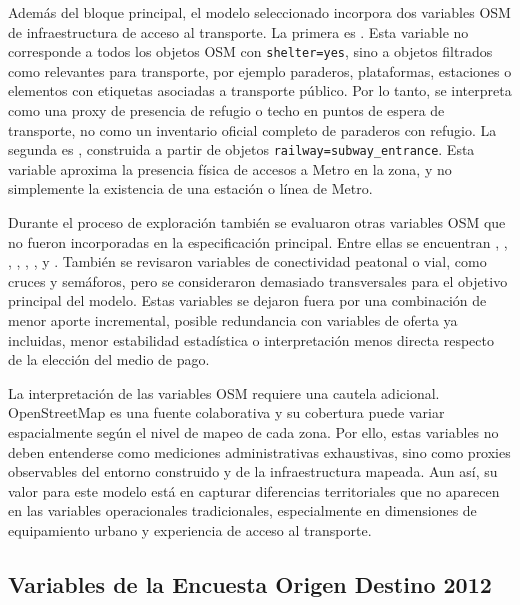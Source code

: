 Además del bloque principal, el modelo seleccionado incorpora dos variables OSM de infraestructura de acceso al transporte. La primera es . Esta variable no corresponde a todos los objetos OSM con \texttt{shelter=yes}, sino a objetos filtrados como relevantes para transporte, por ejemplo paraderos, plataformas, estaciones o elementos con etiquetas asociadas a transporte público. Por lo tanto, se interpreta como una proxy de presencia de refugio o techo en puntos de espera de transporte, no como un inventario oficial completo de paraderos con refugio. La segunda es , construida a partir de objetos \texttt{railway=subway\_entrance}. Esta variable aproxima la presencia física de accesos a Metro en la zona, y no simplemente la existencia de una estación o línea de Metro.

Durante el proceso de exploración también se evaluaron otras variables OSM que no fueron incorporadas en la especificación principal. Entre ellas se encuentran , , , , , ,  y . También se revisaron variables de conectividad peatonal o vial, como cruces y semáforos, pero se consideraron demasiado transversales para el objetivo principal del modelo. Estas variables se dejaron fuera por una combinación de menor aporte incremental, posible redundancia con variables de oferta ya incluidas, menor estabilidad estadística o interpretación menos directa respecto de la elección del medio de pago.

La interpretación de las variables OSM requiere una cautela adicional. OpenStreetMap es una fuente colaborativa y su cobertura puede variar espacialmente según el nivel de mapeo de cada zona. Por ello, estas variables no deben entenderse como mediciones administrativas exhaustivas, sino como proxies observables del entorno construido y de la infraestructura mapeada. Aun así, su valor para este modelo está en capturar diferencias territoriales que no aparecen en las variables operacionales tradicionales, especialmente en dimensiones de equipamiento urbano y experiencia de acceso al transporte.

\subsection{Variables de la Encuesta Origen Destino 2012}


